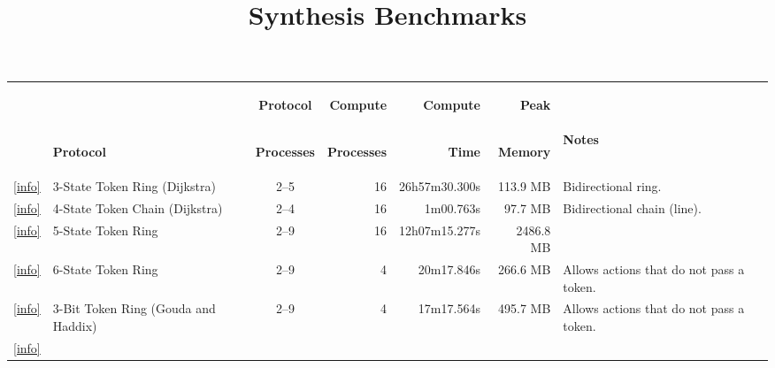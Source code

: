
\title{Synthesis Benchmarks}
\date{}

\newcommand{\LinkText}{[info]}



\begin{tabular}{cl|c|r|r|r|l}
&
& \begin{center}\textbf{Protocol}\end{center}
& \begin{center}\textbf{Compute}\end{center}
& \begin{center}\textbf{Compute}\end{center}
& \begin{center}\textbf{Peak}\end{center}
&
\\
& \begin{center}\textbf{Protocol}\end{center}
& \begin{center}\textbf{Processes}\end{center}
& \begin{center}\textbf{Processes}\end{center}
& \begin{center}\textbf{Time}\end{center}
& \begin{center}\textbf{Memory}\end{center}
& \textbf{Notes}
\\ \hline \href{example/TokenPassing.html#sec:TokenRingThreeState}{\LinkText}
& 3-State Token Ring (Dijkstra)
& 2--5  & 16 & 26h57m30.300s & 113.9 MB & Bidirectional ring.
\\ \href{example/TokenPassing.html#sec:TokenChainDijkstra}{\LinkText}
& 4-State Token Chain (Dijkstra)
& 2--4  & 16 &     1m00.763s &  97.7 MB & Bidirectional chain (line).
\\ \href{example/TokenPassing.html#sec:TokenRingFiveState}{\LinkText}
& 5-State Token Ring
& 2--9  & 16 & 12h07m15.277s &2486.8 MB &
\\ \href{example/TokenPassing.html#sec:TokenRingSixState}{\LinkText}
& 6-State Token Ring
& 2--9  &  4 &    20m17.846s & 266.6 MB & Allows actions that do not pass a token.
\\ \href{example/TokenPassing.html#sec:TokenRingThreeBit}{\LinkText}
& 3-Bit Token Ring (Gouda and Haddix)
& 2--9  &  4 &    17m17.564s & 495.7 MB & Allows actions that do not pass a token.
\\ \hline \href{example/Orientation.html#sec:OrientRingOdd}{\LinkText}

\end{tabular}
